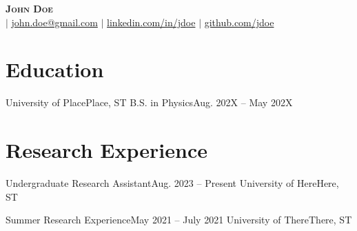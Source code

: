 \documentclass[letterpaper,11pt]{article}
\begin{document}

\begin{center}
    \textbf{\Huge \scshape John Doe} \\ \vspace{2pt}
    \small {} \hspace{2pt}$|$ \href{mailto:john.doe@gmail.com}{john.doe@gmail.com} $|$ 
    \href{https://linkedin.com/in/...}{linkedin.com/in/jdoe} $|$
    \href{https://github.com/...}{github.com/jdoe}
\end{center}



\section{Education}
    \cvSubHeadingListStart
        \cvSubheading
        {University of Place}{Place, ST}
        {B.S. in Physics}{Aug. 202X -- May 202X}
        \cvItemListStart
        \cvItemListEnd
    \cvSubHeadingListEnd



\section{Research Experience}
    \cvSubHeadingListStart
        \cvSubheading
            {Undergraduate Research Assistant}{Aug. 2023 -- Present}
            {University of Here}{Here, ST}
            \cvItemListStart
            \cvItemListEnd

        \cvSubheading
            {Summer Research Experience}{May 2021 -- July 2021}
            {University of There}{There, ST}
            \cvItemListStart
        \cvItemListEnd
\end{document}
